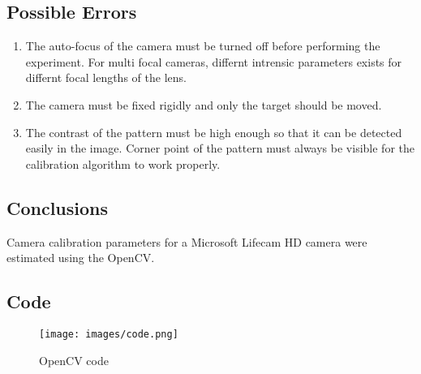\subsection{Possible Errors}
\begin{enumerate}
	\item The auto-focus of the camera must be turned off before performing the experiment. For multi focal cameras, differnt intrensic parameters exists for differnt focal lengths of the lens.
	\item The camera must be fixed rigidly and only the target should be moved.
	\item The contrast of the pattern must be high enough so that it can be detected easily in the image. Corner point of the pattern must always be visible for the calibration algorithm to work properly.
	
\end{enumerate}

\subsection{Conclusions}\label{conclusions}
Camera calibration parameters for a Microsoft Lifecam HD camera were estimated using the OpenCV.

\newpage
\subsection{Code}
\begin{figure}[!h]
	\texttt{[image: images/code.png]}
	\centering
	\caption{\small{OpenCV code}} 
	\label{fig:picture}
\end{figure}

\nocite{*}



 





